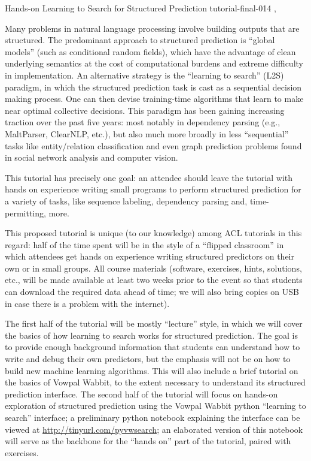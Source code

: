 \begin{tutorial}
  {Hands-on Learning to Search for Structured Prediction}
  {tutorial-final-014}
  {\daydateyear, \tutorialmorningtime}
  {\TutLocA}

Many problems in natural language processing involve building outputs that are structured. The predominant approach to structured prediction is ``global models'' (such as conditional random fields), which have the advantage of clean underlying semantics at the cost of computational burdens and extreme difficulty in implementation. An alternative strategy is the ``learning to search'' (L2S) paradigm, in which the structured prediction task is cast as a sequential decision making process. One can then devise training-time algorithms that learn to make near optimal collective decisions. This paradigm has been gaining increasing traction over the past five years: most notably in dependency parsing (e.g., MaltParser, ClearNLP, etc.), but also much more broadly in less ``sequential'' tasks like entity/relation classification and even graph prediction problems found in social network analysis and computer vision.

This tutorial has precisely one goal: an attendee should leave the tutorial with hands on experience writing small programs to perform structured prediction for a variety of tasks, like sequence labeling, dependency parsing and, time-permitting, more.

This proposed tutorial is unique (to our knowledge) among ACL tutorials in this regard: half of the time spent will be in the style of a ``flipped classroom'' in which attendees get hands on experience writing structured predictors on their own or in small groups. All course materials (software, exercises, hints, solutions, etc., will be made available at least two weeks prior to the event so that students can download the required data ahead of time; we will also bring copies on USB in case there is a problem with the internet).

The first half of the tutorial will be mostly ``lecture'' style, in which we will cover the basics of how learning to search works for structured prediction. The goal is to provide enough background information that students can understand how to write and debug their own predictors, but the emphasis will not be on how to build new machine learning algorithms. This will also include a brief tutorial on the basics of Vowpal Wabbit, to the extent necessary to understand its structured prediction interface. The second half of the tutorial will focus on hands-on exploration of structured prediction using the Vowpal Wabbit python ``learning to search'' interface; a preliminary python notebook explaining the interface can be viewed at \url{http://tinyurl.com/pyvwsearch}; an elaborated version of this notebook will serve as the backbone for the ``hands on'' part of the tutorial, paired with exercises.

\end{tutorial}
